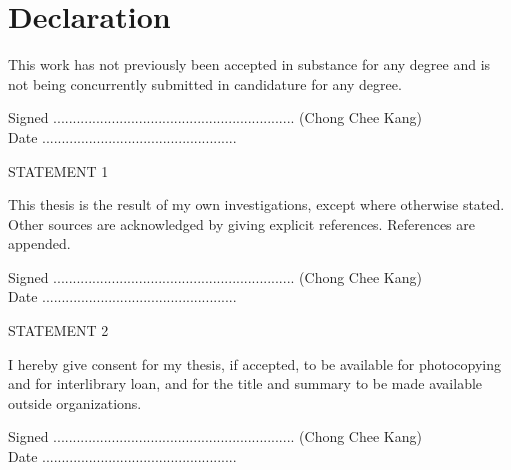 \chapter{Declaration}

This work has not previously been accepted in substance for any degree and is not being concurrently submitted in candidature for any degree.

\begin{flushleft}
Signed .............................................................. (Chong Chee Kang) \\ Date ..................................................
\end{flushleft}

\vspace{15mm}
\centerline{STATEMENT 1}
This thesis is the result of my own investigations, except where otherwise stated. Other sources are acknowledged by giving explicit references. References are appended.

\begin{flushleft}
Signed .............................................................. (Chong Chee Kang) \\ Date ..................................................
\end{flushleft}

\vspace{15mm}
\centerline{STATEMENT 2}
I hereby give consent for my thesis, if accepted, to be available for photocopying and for interlibrary loan, and for the title and summary to be made available outside organizations.

\begin{flushleft}
Signed .............................................................. (Chong Chee Kang) \\ Date ..................................................
\end{flushleft}
